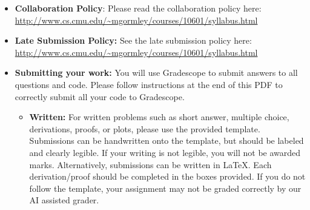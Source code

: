 \documentclass[11pt,addpoints,answers]{exam}
\begin{document}
\begin{itemize}

\item \textbf{Collaboration Policy}: Please read the collaboration policy here: \url{http://www.cs.cmu.edu/~mgormley/courses/10601/syllabus.html}

\item\textbf{Late Submission Policy:} See the late submission policy here: \url{http://www.cs.cmu.edu/~mgormley/courses/10601/syllabus.html}

\item\textbf{Submitting your work:} You will use Gradescope to submit
  answers to all questions and code. Please
  follow instructions at the end of this PDF to correctly submit all your code to Gradescope.

  \begin{itemize}
    

    
   \item \textbf{Written:} For written problems such as short answer, multiple choice, derivations, proofs, or plots, please use the provided template. Submissions can be handwritten onto the template, but should be labeled and clearly legible. If your writing is not legible, you will not be awarded marks. Alternatively, submissions can be written in LaTeX. 
   Each derivation/proof should be completed in the boxes provided. If you do not follow the template, your assignment may not be graded correctly by our AI assisted grader.


\end{itemize}
\end{itemize}
\end{document}
